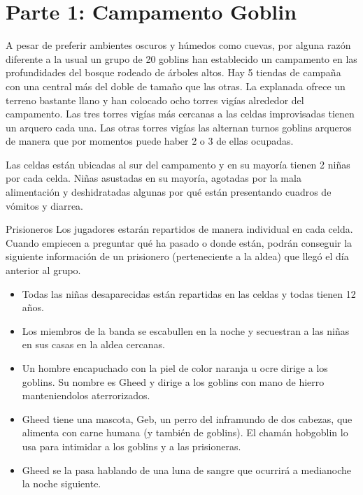 \documentclass[10pt,twoside,twocolumn,openany]{dndbook}
\begin{document}
\section{Parte 1: Campamento Goblin}

A pesar de preferir ambientes oscuros y húmedos como cuevas, por alguna razón diferente a la usual un grupo de 20 goblins han establecido un campamento en las profundidades del bosque rodeado de árboles altos. Hay 5 tiendas de campaña con una central más del doble de tamaño que las otras. La explanada ofrece un terreno bastante llano y han colocado ocho torres vigías alrededor del campamento. Las tres torres vigías más cercanas a las celdas improvisadas tienen un arquero cada una. Las otras torres vigías las alternan turnos goblins arqueros de manera que por momentos puede haber 2 o 3 de ellas ocupadas.

Las celdas están ubicadas al sur del campamento y en su mayoría tienen 2 niñas por cada celda. Niñas asustadas en su mayoría, agotadas por la mala alimentación y deshidratadas algunas por qué están presentando cuadros de vómitos y diarrea.

\begin{DndComment}{Prisioneros}
Los jugadores estarán repartidos de manera individual en cada celda. Cuando empiecen a preguntar qué ha pasado o donde están, podrán conseguir la siguiente información de un prisionero (perteneciente a la aldea) que llegó el día anterior al grupo.

\begin{itemize}
  \item Todas las niñas desaparecidas están repartidas en las celdas y todas tienen 12 años.
  \item Los miembros de la banda se escabullen en la noche y secuestran a las niñas en sus casas en la aldea cercanas.
  \item Un hombre encapuchado con la piel de color naranja u ocre dirige a los goblins. Su nombre es Gheed y dirige a los goblins con mano de hierro manteniendolos aterrorizados.
  \item Gheed tiene una mascota, Geb, un perro del inframundo de dos cabezas, que alimenta con carne humana (y también de goblins). El chamán hobgoblin lo usa para intimidar a los goblins y a las prisioneras.
  \item Gheed se la pasa hablando de una luna de sangre que ocurrirá a medianoche la noche siguiente.
\end{itemize}

\end{DndComment}
\end{document}
